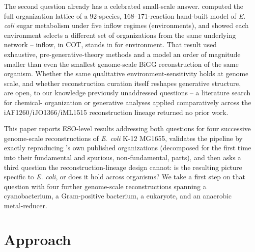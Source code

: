 \documentclass[nocrop]{bioinfo}
\begin{document}
The second question already has a celebrated small-scale answer. \citet{centler2006} computed
the full organization lattice of a 92-species, 168--171-reaction hand-built model of
\textit{E. coli} sugar metabolism under five inflow regimes (environments), and showed each
environment selects a different set of organizations from the same underlying network --
inflow, in COT, stands in for environment. That result used exhaustive, pre-generative-theory
methods and a model an order of magnitude smaller than even the smallest genome-scale BiGG
reconstruction of the same organism. Whether the same qualitative environment-sensitivity holds
at genome scale, and whether reconstruction curation itself reshapes generative structure, are
open, to our knowledge previously unaddressed questions -- a literature search for chemical-
organization or generative analyses applied comparatively across the iAF1260/iJO1366/iML1515
reconstruction lineage returned no prior work.

This paper reports ESO-level results addressing both questions for four successive genome-scale
reconstructions of \textit{E. coli} K-12 MG1655, validates the pipeline by exactly reproducing
\citeauthor{centler2006}'s own published organizations (decomposed for the first time into
their fundamental and spurious, non-fundamental, parts), and then asks a third question the
reconstruction-lineage design cannot: is the resulting picture specific to \textit{E. coli}, or
does it hold across organisms? We take a first step on that question with four further
genome-scale reconstructions spanning a cyanobacterium, a Gram-positive bacterium, a eukaryote,
and an anaerobic metal-reducer.

\section{Approach}
\label{sec:approach}
\end{document}
